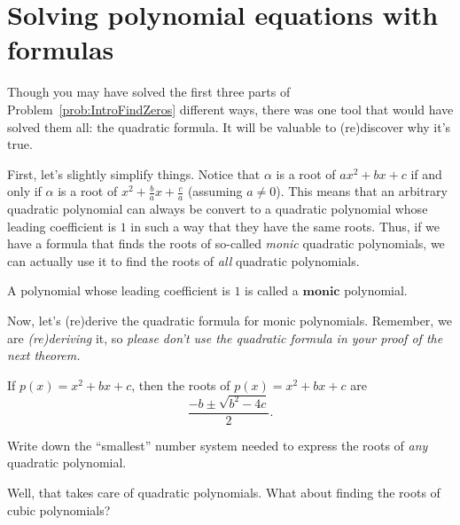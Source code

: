\section{Solving polynomial equations with formulas}
Though you may have solved the first three parts of Problem~\ref{prob:IntroFindZeros} different ways, there was one tool that would have solved them all: the quadratic formula. It will be valuable to (re)discover why it's true. 

First, let's slightly simplify things. Notice that $\alpha$ is a root of $ax^2 + bx + c$ if and only if $\alpha$ is a root of $x^2 + \frac{b}{a}x + \frac{c}{a}$ (assuming $a\neq 0$). This means that an arbitrary quadratic polynomial can always be convert to a quadratic polynomial whose leading coefficient is $1$ in such a way that they have the same roots. Thus, if we have a formula that finds the roots of so-called \emph{monic} quadratic polynomials, we can actually use it to find the roots of \emph{all} quadratic polynomials.

\begin{definition}
A polynomial whose leading coefficient is $1$ is called a $\textbf{monic}$ polynomial.
\end{definition}

Now, let's (re)derive the quadratic formula for monic polynomials. Remember, we are \emph{(re)deriving} it, so \emph{please don't use the quadratic formula in your proof of the next theorem.}

\begin{theorem}\label{thm:MonicQuadratic}
If $p(x) = x^2 + bx + c$, then the roots of $p(x) = x^2 + bx + c$ are \[\frac{-b\pm\sqrt{b^2 - 4c}}{2}.\]
\end{theorem}

\begin{problem}
Write down the ``smallest'' number system needed to express the roots of \emph{any} quadratic polynomial.
\end{problem}

Well, that takes care of quadratic polynomials. What about finding the roots of cubic polynomials?



